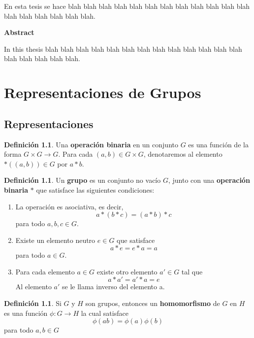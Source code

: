 \documentclass[12pt]{book}
\theoremstyle{definition}
\newtheorem{definition}[theorem]{Definición}
\newcounter{in}
\newcounter{ini}
\begin{document}
En esta tesis se hace blah blah blah blah blah blah blah blah blah
blah blah blah blah blah blah blah blah blah.

\vspace{2cm}

\begin{flushleft}
  {\bfseries\Large Abstract}
\end{flushleft}

In this thesis blah blah blah blah blah blah blah blah blah
blah blah blah blah blah blah blah blah blah.



 \newpage \thispagestyle{empty}

\chapter{Representaciones de Grupos}
\label{cha:primer-capitulo}

\section{Representaciones}

\begin{definition}
  Una \textbf{operación binaria} en un conjunto $G$ es una función
  de la forma $G  \times G \rightarrow G$. Para cada $(a,b)\in G
  \times G$, denotaremos al elemento $*((a,b))\in G$ por $a*b$.
\end{definition}

\begin{definition}
  Un \textbf{grupo} es un conjunto no vacío $G$, junto con una
  \textbf{operación binaria} $*$ que satisface las siguientes condiciones:
    \begin{enumerate}
    \item La operación es asociativa, es decir, $$a*(b*c)=(a*b)*c$$ para todo $a,b,c \in G$.
    \item Existe un elemento neutro $e \in G$ que
      satisface $$a*e=e*a=a$$ para todo $a \in G$.
    \item Para cada elemento $a \in G$ existe otro elemento $a' \in G$
      tal que $$a*a'=a'*a=e$$ Al elemento $a'$ se le llama inverso del
      elemento a.
    \end{enumerate}
\end{definition}

\begin{definition}
  Si $G$ y $H$ son grupos, entonces un \textbf{homomorfismo} de $G$
  en $H$ es una función $\phi:G\rightarrow H$ la cual
  satisface $$\phi(ab)=\phi(a)\phi(b)$$ para todo $a,b \in G$
\end{definition}
\end{document}
